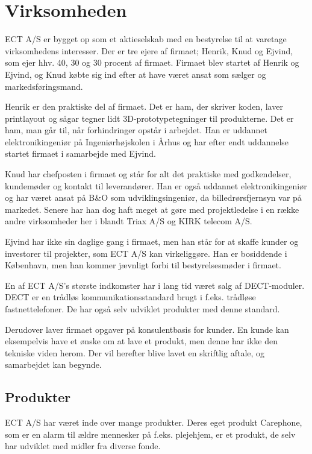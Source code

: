 \chapter{Virksomheden}

ECT A/S er bygget op som et aktieselskab med en bestyrelse til at varetage virksomhedens interesser. Der er tre ejere af firmaet; Henrik, Knud og Ejvind, som ejer hhv. 40, 30 og 30 procent af firmaet. Firmaet blev startet af Henrik og Ejvind, og Knud købte sig ind efter at have været ansat som sælger og markedsføringsmand.

Henrik er den praktiske del af firmaet. Det er ham, der skriver koden, laver printlayout og sågar tegner lidt 3D-prototypetegninger til produkterne. Det er ham, man går til, når forhindringer opstår i arbejdet. Han er uddannet elektronikingeniør på Ingeniørhøjskolen i Århus og har efter endt uddannelse startet firmaet i samarbejde med Ejvind.

Knud har chefposten i firmaet og står for alt det praktiske med godkendelser, kundemøder og kontakt til leverandører. Han er også uddannet elektronikingeniør og har været ansat på B\&O som udviklingsingeniør, da billedrørsfjernsyn var på markedet. Senere har han dog haft meget at gøre med projektledelse i en række andre virksomheder her i blandt Triax A/S og KIRK telecom A/S.

Ejvind har ikke sin daglige gang i firmaet, men han står for at skaffe kunder og investorer til projekter, som ECT A/S kan virkeliggøre. Han er bosiddende i København, men han kommer jævnligt forbi til bestyrelsesmøder i firmaet.

En af ECT A/S's største indkomster har i lang tid været salg af DECT-moduler. DECT er en trådløs kommunikationsstandard brugt i f.eks. trådløse fastnettelefoner. De har også selv udviklet produkter med denne standard.

Derudover laver firmaet opgaver på konsulentbasis for kunder. En kunde kan eksempelvis have et ønske om at lave et produkt, men denne har ikke den tekniske viden herom. Der vil herefter blive lavet en skriftlig aftale, og samarbejdet kan begynde.

\newpage
\section{Produkter}

ECT A/S har været inde over mange produkter. Deres eget produkt Carephone, som er en alarm til ældre mennesker på f.eks. plejehjem, er et produkt, de selv har udviklet med midler fra diverse fonde.

